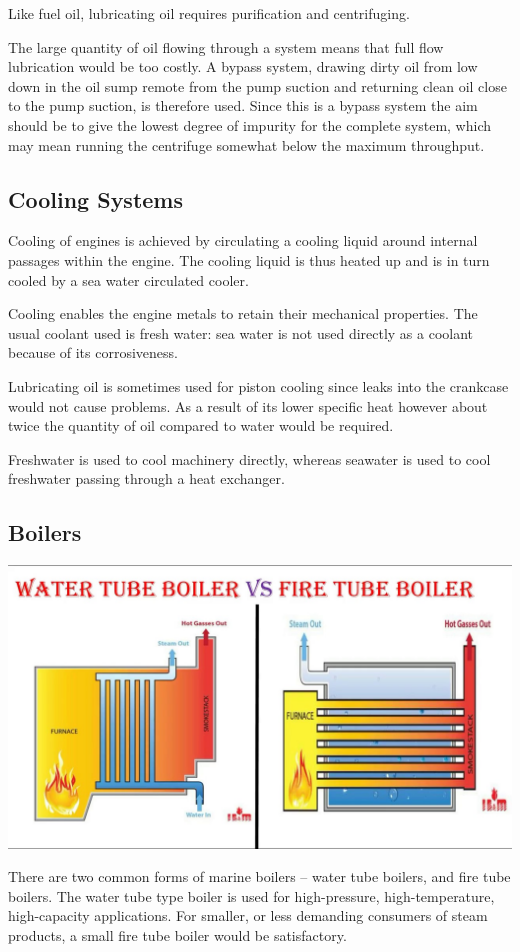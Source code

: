 \documentclass[11pt,a4paper]{article}
\begin{document}
Like fuel oil, lubricating oil requires purification and centrifuging.

The large quantity of oil flowing through a system means that full flow lubrication would be too costly. A bypass system, drawing dirty oil from low down in the oil sump remote from the pump suction and returning clean oil close to the pump suction, is therefore used. Since this is a bypass system the aim should be to give the lowest degree of impurity for the complete system, which may mean running the centrifuge somewhat below the maximum throughput.
\subsection{Cooling Systems}
Cooling of engines is achieved by circulating a cooling liquid around internal passages within the engine. The cooling liquid is thus heated up and is in turn cooled by a sea water circulated cooler.

Cooling enables the engine metals to retain their mechanical properties. The usual coolant used is fresh water: sea water is not used directly as a coolant because of its corrosiveness.

Lubricating oil is sometimes used for piston cooling since leaks into the crankcase would not cause problems. As a result of its lower specific heat however about twice the quantity of oil compared to water would be required.\cite{m2}

Freshwater is used to cool machinery directly, whereas seawater is used to cool freshwater passing through a heat exchanger.
\subsection{Boilers}
\begin{center}
\includegraphics[width=\textwidth]{boilers.jpg}
\end{center}
There are two common forms of marine boilers -- water tube boilers, and fire tube boilers. The water tube type boiler is used for high-pressure, high-temperature, high-capacity applications. For smaller, or less demanding consumers of steam products, a small fire tube boiler would be satisfactory.
\end{document}

